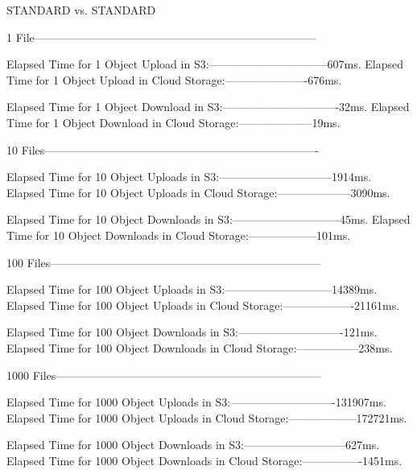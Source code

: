 \begin{code}
STANDARD vs. STANDARD

1 File---------------------------------------------------------------------------

Elapsed Time for 1  Object Upload in S3:--------------------------------607ms.
Elapsed Time for 1 Object Upload in Cloud Storage:----------------------676ms.

Elapsed Time for 1 Object Download in S3:-------------------------------32ms.
Elapsed Time for 1 Object Download in Cloud Storage:--------------------19ms.

10 Files-------------------------------------------------------------------------

Elapsed Time for 10  Object Uploads in S3:------------------------------1914ms.
Elapsed Time for 10 Object Uploads in Cloud Storage:--------------------3090ms.

Elapsed Time for 10 Object Downloads in S3:-----------------------------45ms.
Elapsed Time for 10 Object Downloads in Cloud Storage:------------------101ms.

100 Files------------------------------------------------------------------------

Elapsed Time for 100  Object Uploads in S3:-----------------------------14389ms.
Elapsed Time for 100 Object Uploads in Cloud Storage:-------------------21161ms.

Elapsed Time for 100 Object Downloads in S3:----------------------------121ms.
Elapsed Time for 100 Object Downloads in Cloud Storage:-----------------238ms.

1000 Files-----------------------------------------------------------------------

Elapsed Time for 1000  Object Uploads in S3:----------------------------131907ms.
Elapsed Time for 1000 Object Uploads in Cloud Storage:------------------172721ms.

Elapsed Time for 1000 Object Downloads in S3:---------------------------627ms.
Elapsed Time for 1000 Object Downloads in Cloud Storage:----------------1451ms.

\end{code}

\newpage

